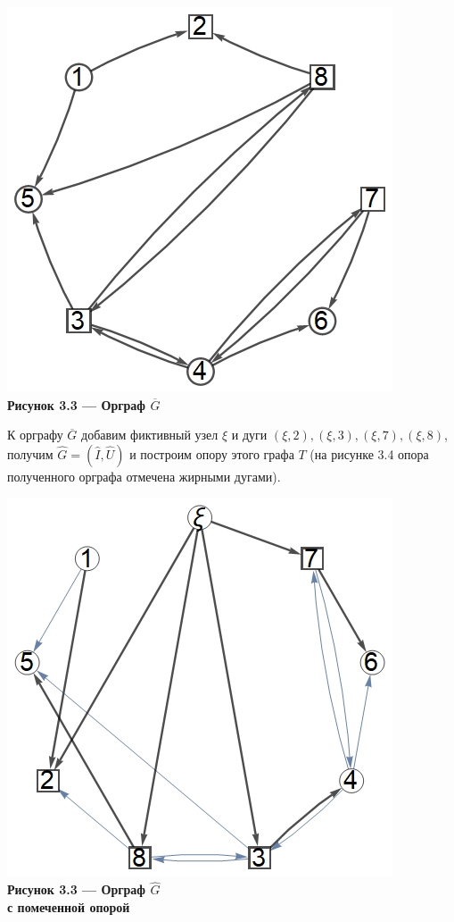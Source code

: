 \documentclass[14pt]{extarticle}%
\begin{document}
\begin{center}
\includegraphics[scale=0.5]{grs/s1overg.png}\\
\textbf{Рисунок 3.3 --- Орграф $\overline{G}$}
\end{center}

К орграфу $\overline{G}$ добавим фиктивный узел $\xi$ и дуги $(\xi, 2),(\xi,3),(\xi,7), (\xi,8)$, получим $\widehat{G}=(\widehat{I},\widehat{U})$ и построим опору этого графа $T$ (на рисунке 3.4 опора полученного орграфа отмечена жирными дугами). 

\begin{center}
\includegraphics[scale=0.5]{grs/s1ghat.png}\\
\textbf{Рисунок 3.3 --- Орграф $\widehat{G}$ \\с помеченной опорой}
\end{center}
\end{document}
